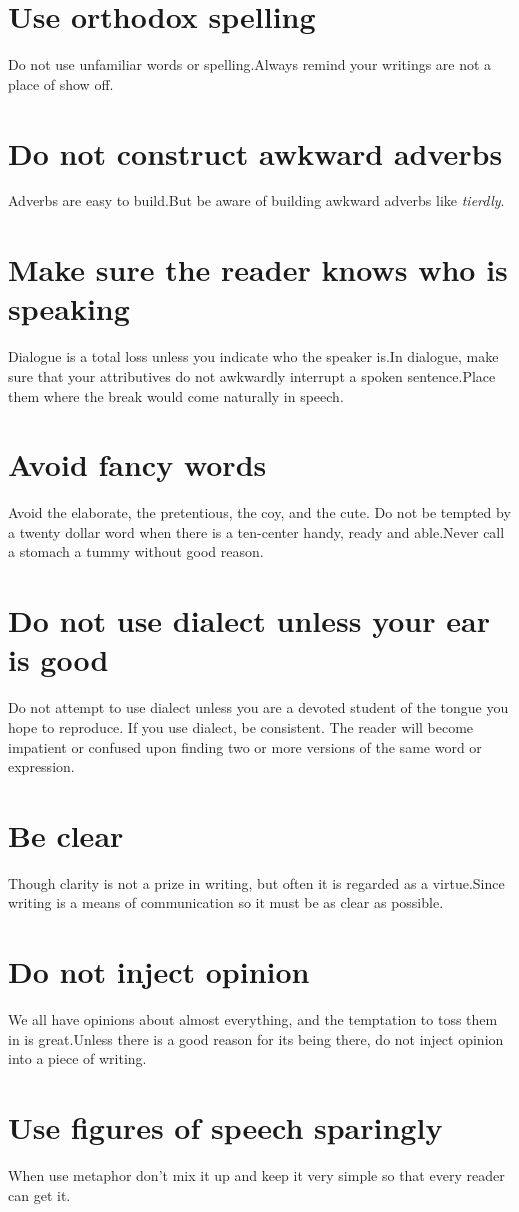 \documentclass{report}
\begin{document}
\section{Use orthodox spelling}
Do not use unfamiliar words or spelling.Always remind your writings are not a place of show off.
\section{Do not construct awkward adverbs}
Adverbs are easy to build.But be aware  of building awkward adverbs like \textit{tierdly}.   
\section{Make sure the reader knows who is speaking}
Dialogue is a total loss unless you indicate who the speaker is.In dialogue, make sure that your attributives do not awkwardly interrupt a spoken sentence.Place them where the break would come naturally in speech.
\section{Avoid fancy words}
Avoid the elaborate, the pretentious, the coy, and the cute. Do not be tempted by a twenty dollar word when there is a ten-center handy, ready and able.Never call a stomach a tummy without good reason.
\section{ Do not use dialect unless your ear is good}
Do not attempt to use dialect unless you are a devoted student of the tongue you hope to reproduce. If you use dialect, be consistent. The reader will become impatient or confused upon finding two or more versions of the same word or expression.
\section{Be clear}
Though clarity is not a prize in writing, but often it is regarded as a virtue.Since writing is a means of communication so it must be as clear as possible.
\section{Do not inject opinion}
We all have opinions about almost everything, and the temptation to toss them in is great.Unless there is a good reason for its being there, do not inject opinion into a piece of writing. 
\section{Use figures of speech sparingly}
When use metaphor don't mix it up and keep it very simple so that every reader can get it.
\end{document}
